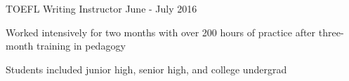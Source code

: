 \begin{cventries}
  \cventry
    {TOEFL Writing Instructor \vspace{0.1em}} %
    {} %
    {} %
    {\vspace{-0.1em}June - July 2016} %
    {
      \begin{cvitems} %
        \item[] {Worked intensively for two months with over 200 hours of practice after three-month training in pedagogy}
        \item[] {Students included junior high, senior high, and college undergrad}
      \end{cvitems}
    }
\end{cventries}
